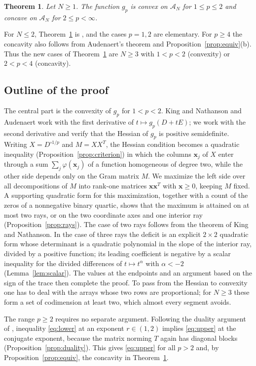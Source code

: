 \documentclass[11pt]{amsart}
\newtheorem{theorem}{Theorem}[section]
\theoremstyle{definition}
\theoremstyle{remark}
\numberwithin{equation}{section}
\newcommand{\cA}{\mathcal{A}}
\newcommand{\bx}{\mathbf{x}}
\begin{document}
\begin{theorem}\label{thm:convex}
Let $N\ge1$. The function $g_p$ is convex on $\cA_N$ for $1\le p\le2$ and concave on $\cA_N$ for $2\le p<\infty$.
\end{theorem}

For $N\le2$, Theorem~\ref{thm:convex} is \cite[Lemma~3]{KN04}, and the cases $p=1,2$ are elementary. For $p\ge4$ the concavity also follows from Audenaert's theorem \cite[Section~4.4]{Aud08} and Proposition~\ref{prop:equiv}(b). Thus the new cases of Theorem~\ref{thm:convex} are $N\ge3$ with $1<p<2$ (convexity) or $2<p<4$ (concavity).

\subsection*{Outline of the proof}
The central part is the convexity of $g_p$ for $1<p<2$. King and Nathanson \cite[Section~3]{KN04} and Audenaert \cite[Section~5]{Aud08} work with the first derivative of $t\mapsto g_p(D+tE)$; we work with the second derivative and verify that the Hessian of $g_p$ is positive semidefinite. Writing $X=D^{\circ1/p}$ and $M=XX^{T}$, the Hessian condition becomes a quadratic inequality (Proposition~\ref{prop:criterion}) in which the columns $\bx_j$ of $X$ enter through a sum $\sum_j\varphi(\bx_j)$ of a function homogeneous of degree two, while the other side depends only on the Gram matrix $M$. We maximize the left side over all decompositions of $M$ into rank-one matrices $\bx\bx^T$ with $\bx\ge0$, keeping $M$ fixed. A supporting quadratic form for this maximization, together with a count of the zeros of a nonnegative binary quartic, shows that the maximum is attained on at most two rays, or on the two coordinate axes and one interior ray (Proposition~\ref{prop:rays}). The case of two rays follows from the theorem of King and Nathanson. In the case of three rays the deficit is an explicit $2\times2$ quadratic form whose determinant is a quadratic polynomial in the slope of the interior ray, divided by a positive function; its leading coefficient is negative by a scalar inequality for the divided differences of $t\mapsto t^{\alpha}$ with $\alpha<-2$ (Lemma~\ref{lem:scalar}). The values at the endpoints and an argument based on the sign of the trace then complete the proof. To pass from the Hessian to convexity one has to deal with the arrays whose two rows are proportional; for $N\ge3$ these form a set of codimension at least two, which almost every segment avoids.

The range $p\ge2$ requires no separate argument. Following the duality argument of \cite[Section~2.1]{Aud08}, inequality \eqref{eq:lower} at an exponent $r\in(1,2)$ implies \eqref{eq:upper} at the conjugate exponent, because the matrix norming $T$ again has diagonal blocks (Proposition~\ref{prop:duality}). This gives \eqref{eq:upper} for all $p>2$ and, by Proposition~\ref{prop:equiv}, the concavity in Theorem~\ref{thm:convex}.
\end{document}
